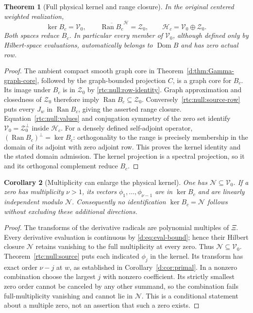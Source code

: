 \documentclass[11pt,a4paper]{article}
\numberwithin{equation}{section}
\newtheorem{theorem}{Theorem}[section]
\newtheorem{corollary}[theorem]{Corollary}
\theoremstyle{definition}\newtheorem{definition}[theorem]{Definition}
\theoremstyle{remark}\newtheorem{remark}[theorem]{Remark}
\newcommand{\Hh}{\mathcal H}\newcommand{\Hw}{\mathcal H}
\begin{document}
\begin{theorem}[Full physical kernel and range closure]\label{rtc:null:kernel}
In the original centered weighted realization,
\begin{equation}\label{rtc:null:kernel-identity}
 \ker B_c=\mathcal V_0,\qquad
 \overline{\operatorname{Ran}B_c}^{\Hh}=\mathcal Z_0,\qquad
 \Hh_c=\mathcal V_0\oplus\mathcal Z_0.
\end{equation}
Both spaces reduce $B_c$.  In particular every member of
$\mathcal V_0$, although defined only by Hilbert-space evaluations,
automatically belongs to $\operatorname{Dom}B$ and has zero actual row.
\end{theorem}
\begin{proof}
The ambient compact smooth graph core in
Theorem~\ref{d:thm:Gamma-graph-core}, followed by the graph-bounded
projection $C$, is a graph core for $B_c$.
Its image under $B_c$ is in $\mathcal Z_0$ by
\eqref{rtc:null:row-identity}.  Graph approximation and closedness of
$\mathcal Z_0$ therefore imply
$\operatorname{Ran}B_c\subseteq\mathcal Z_0$.
Conversely~\eqref{rtc:null:source-row} puts every $J_w$ in
$\operatorname{Ran}B_c$, giving the asserted range closure.
Equation~\eqref{rtc:null:values} and conjugation symmetry of the zero
set identify $\mathcal V_0=\mathcal Z_0^\perp$ inside $\Hh_c$.
For a densely defined self-adjoint operator,
$(\operatorname{Ran}B_c)^\perp=\ker B_c$: orthogonality to the range
is precisely membership in the domain of its adjoint with zero adjoint
row.  This proves the kernel identity and the stated domain admission.
The kernel projection is a spectral projection, so it and its orthogonal
complement reduce $B_c$.
\end{proof}

\begin{corollary}[Multiplicity can enlarge the physical kernel]\label{rtc:null:multiplicity}
One has $\mathcal N\subseteq\mathcal V_0$.  If a zero has multiplicity
$\nu>1$, its vectors $\phi_1,\ldots,\phi_{\nu-1}$ are in
$\ker B_c$ and are linearly independent modulo $\mathcal N$.
Consequently no identification $\ker B_c=\mathcal N$ follows without
excluding these additional directions.
\end{corollary}
\begin{proof}
The transforms of the derivative radicals are polynomial multiples of
$\Xi$.  Every derivative evaluation is continuous by
\eqref{d:eq:eval-bound}; hence their Hilbert closure $\mathcal N$
retains vanishing to the full multiplicity at every zero.  Thus
$\mathcal N\subseteq\mathcal V_0$.
Theorem~\ref{rtc:null:source} puts each indicated $\phi_j$ in the kernel.
Its transform has exact order $\nu-j$ at $w$, as established in
Corollary~\ref{d:cor:primal}.  In a nonzero combination choose the
largest $j$ with nonzero coefficient.  Its strictly smallest zero order
cannot be canceled by any other summand, so the combination fails
full-multiplicity vanishing and cannot lie in $\mathcal N$.
This is a conditional statement about a multiple zero, not an assertion
that such a zero exists.
\end{proof}
\end{document}
